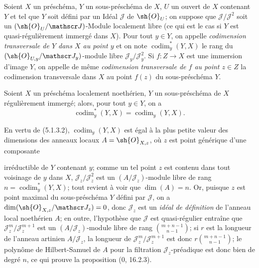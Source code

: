 \begin{definition}[19.1.3]
Soient $X$ un préschéma, $Y$ un sous-préschéma de $X$, $U$ un ouvert de $X$ contenant $Y$ et tel que $Y$ soit défini par un Idéal $\mathscr J$ de $\sh{O}_U$; on suppose que $\mathscr J/\mathscr J^2$ soit un $(\sh{O}_U/\mathscr J)$-Module localement libre (ce qui est le cas si $Y$ est quasi-régulièrement immergé dans $X$). Pour tout $y\in Y$, on appelle \emph{codimension transversale de $Y$ dans $X$ au point $y$} et on note $\operatorname{codim}_y^*(Y,X)$ le rang du $(\sh{O}_{U,y}/\mathscr J_y)$-module libre $\mathscr J_y/\mathscr J_y^2$. Si $f:Z\to X$ est une immersion d'image $Y$, on appelle de même \emph{codimension transversale de $f$ au point $z\in Z$} la codimension transversale dans $X$ au point $f(z)$ du sous-préschéma $Y$.
\end{definition}

\begin{proposition}[19.1.4]
\label{IV.19.1.4}
Soient $X$ un préschéma localement noethérien, $Y$ un sous-préschéma de $X$ régulièrement immergé; alors, pour tout $y\in Y$, on a
\begin{equation}
  \operatorname{codim}_y^*(Y,X)=\operatorname{codim}_y(Y,X).
  \tag{19.1.4.1}\label{IV.19.1.4.1}
\end{equation}
\end{proposition}

En vertu de (5.1.3.2), $\operatorname{codim}_y(Y,X)$ est égal à la plus petite valeur des dimensions des anneaux locaux $A=\sh{O}_{X,z}$, où $z$ est point générique d'une composante


irréductible de $Y$ contenant $y$; comme un tel point $z$ est contenu dans tout voisinage de $y$ dans $X$, $\mathscr J_z/\mathscr J_z^2$ est un $(A/\mathscr J_z)$-module libre de rang $n=\operatorname{codim}_y^*(Y,X)$; tout revient à voir que $\dim(A)=n$. Or, puisque $z$ est point maximal du sous-préschéma $Y$ défini par $\mathscr J$, on a $\dim(\sh{O}_{X,z}/\mathscr J_z)=0$, donc $\mathscr J_z$ est un \emph{idéal de définition} de l'anneau local noethérien $A$; en outre, l'hypothèse que $\mathscr J$ est quasi-régulier entraîne que $\mathscr J_z^m/\mathscr J_z^{m+1}$ est un $(A/\mathscr J_z)$-module libre de rang $\binom{m+n-1}{n-1}$; si $r$ est la longueur de l'anneau artinien $A/\mathscr J_z$, la longueur de $\mathscr J_z^m/\mathscr J_z^{m+1}$ est donc $r\binom{m+n-1}{n-1}$; le polynôme de Hilbert-Samuel de $A$ pour la filtration $\mathscr J_z$-préadique est donc bien de degré $n$, ce qui prouve la proposition ($0$, 16.2.3).

